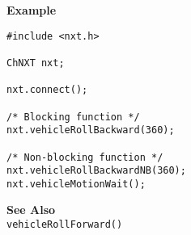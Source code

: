 \noindent
{\bf Example}
\begin{lstlisting}
#include <nxt.h>

ChNXT nxt;

nxt.connect();

/* Blocking function */
nxt.vehicleRollBackward(360);

/* Non-blocking function */
nxt.vehicleRollBackwardNB(360);
nxt.vehicleMotionWait();
\end{lstlisting}

\noindent
{\bf See Also}\\
\texttt{vehicleRollForward()}

